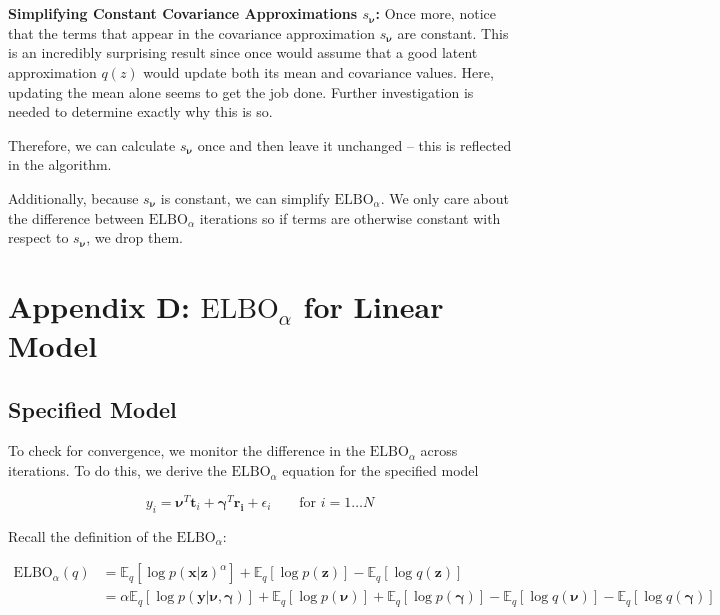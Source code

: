 \documentclass[letterpaper,12pt]{article}
\newcommand{\lb}{\left [} %
\newcommand{\rb}{\right ]} %
\newcommand{\pz}{\ensuremath{p(\boldsymbol{z})}}
\newcommand{\pxgivenz}{\ensuremath{p(\boldsymbol{x} | \boldsymbol{z})}}
\newcommand{\qz}{\ensuremath{q(\boldsymbol{z})}}
\newcommand{\nuv}{\boldsymbol{\nu}} %
\newcommand{\gammav}{\boldsymbol{\gamma}} %
\newcommand{\elbo}{\ensuremath{\mathrm{ELBO}}}
\newcommand{\E}{\mathbb{E}_q}
\newcommand{\el}{\left[} %
\newcommand{\er}{\right]} %
\begin{document}
\\ \\
\noindent \textbf{Simplifying Constant Covariance Approximations $s_\nuv$:} Once more, notice that the terms that appear in the covariance approximation $s_\nuv$ are constant. This is an incredibly surprising result since once would assume that a good latent approximation $q(z)$ would update both its mean and covariance values. Here, updating the mean alone seems to get the job done. Further investigation is needed to determine exactly why this is so.

Therefore, we can calculate $s_\nuv$ once and then leave it unchanged -- this is reflected in the algorithm.

Additionally, because $s_\nuv$ is constant, we can simplify  $\elbo_\alpha$. We only care about the difference between $\elbo_\alpha$ iterations so if terms are otherwise constant with respect to $s_\nuv$, we drop them.


\section{Appendix D: $\elbo_\alpha$ for Linear Model}

\subsection{Specified Model}

To check for convergence, we monitor the difference in the $\elbo_\alpha$ across iterations. To do this, we derive the $\elbo_\alpha$ equation for the specified model

\begin{equation}
    y_i=\mathbf{\nu}^T\mathbf{t}_i+\mathbf{\gamma}^T \mathbf{r_i}+\epsilon_i \qquad \text{for }i=1\ldots N 
\end{equation}

Recall the definition of the $\elbo_\alpha$:

\begin{equation}
\begin{split}
    \elbo_\alpha(q) &= \E \el \log \pxgivenz^\alpha \er + \E \el \log \pz \er   - \E \el \log \qz \er\\
    &= \alpha \E \lb \log p(\boldsymbol{y} | \nuv, \gammav) \rb + \E \lb \log p(\nuv) \rb + \E \lb \log p(\gammav) \rb - \E \lb \log q(\nuv) \rb - \E \lb \log q(\gammav) \rb \\
\end{split}
\end{equation}
\end{document}
